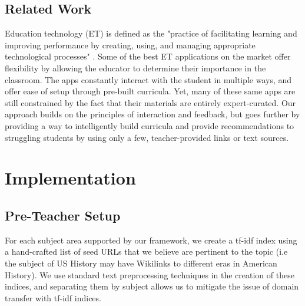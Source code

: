 \documentclass[11pt,a4paper]{article}
\begin{document}
\subsection{Related Work}
Education technology (ET) is defined as the "practice of facilitating learning and improving performance by creating, using, and managing appropriate technological processes" \cite{hlynka_jacobsen}. Some of the best ET applications on the market offer flexibility by allowing the educator to determine their importance in the classroom. The apps constantly interact with the student in multiple ways, and offer ease of setup through pre-built curricula. Yet, many of these same apps are still constrained by the fact that their materials are entirely expert-curated. Our approach builds on the principles of interaction and feedback, but goes further by providing a way to intelligently build curricula and provide recommendations to struggling students by using only a few, teacher-provided links or text sources.
\section{Implementation}
\subsection{Pre-Teacher Setup} \label{pre_teacher}
For each subject area supported by our framework, we create a tf-idf index \cite{Ramos_usingtf-idf} using a hand-crafted list of seed URLs that we believe are pertinent to the topic (i.e the subject of US History may have Wikilinks to different eras in American History). We use standard text preprocessing techniques \cite{TODO} in the creation of these indices, and separating them by subject allows us to mitigate the issue of domain transfer \cite{TODO} with tf-idf indices.
\end{document}
